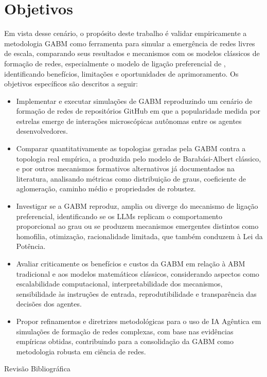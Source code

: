 \documentclass[12pt,oneside,a4paper,brazil,sumario=tradicional]{abntex2}
\begin{document}
\section*{Objetivos}
Em vista desse cenário, o propósito deste trabalho é validar empiricamente a metodologia GABM como ferramenta para simular a emergência de redes livres de escala, comparando seus resultados e mecanismos com os modelos clássicos de formação de redes, especialmente o modelo de ligação preferencial de , identificando benefícios, limitações e oportunidades de aprimoramento. Os objetivos específicos são descritos a seguir:

\begin{itemize}
  \item Implementar e executar simulações de GABM reproduzindo um cenário de formação de redes de repositórios GitHub em que a popularidade medida por estrelas emerge de interações microscópicas autônomas entre os agentes desenvolvedores.
  \item Comparar quantitativamente as topologias geradas pela GABM contra a topologia real empírica, a produzida pelo modelo de Barabási-Albert clássico, e por outros mecanismos formativos alternativos já documentados na literatura, analisando métricas como distribuição de graus, coeficiente de aglomeração, caminho médio e propriedades de robustez.
  \item Investigar se a GABM reproduz, amplia ou diverge do mecanismo de  ligação preferencial, identificando se os LLMs replicam o comportamento proporcional ao grau ou se produzem mecanismos emergentes distintos como homofilia, otimização, racionalidade limitada, que também conduzem à Lei da Potência.
  \item Avaliar criticamente os benefícios e custos da GABM em relação à ABM tradicional e aos modelos matemáticos clássicos, considerando aspectos como escalabilidade computacional, interpretabilidade dos mecanismos, sensibilidade às instruções de entrada, reprodutibilidade e transparência das decisões dos agentes.
  \item Propor refinamentos e diretrizes metodológicas para o uso de IA Agêntica em simulações de formação de redes complexas, com base nas evidências empíricas obtidas, contribuindo para a consolidação da GABM como metodologia robusta em ciência de redes.
\end{itemize}
\begin{center}\Large Revisão Bibliográfica\end{center}
\end{document}

